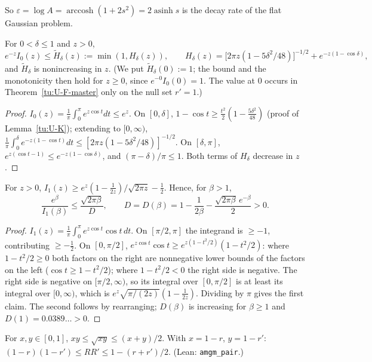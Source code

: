 So $\varepsilon=\log A=\operatorname{arccosh}(1+2s^2)=2\operatorname{asinh}s$ is the decay rate of the flat
Gaussian problem.

\begin{lemma}\label{tu:U-bessel}
For $0<\delta\le1$ and $z>0$,
\[
e^{-z}I_0(z)\le\tilde H_\delta(z):=\min(1,H_\delta(z)),\qquad
H_\delta(z)=\bigl[2\pi z(1-5\delta^2/48)\bigr]^{-1/2}+e^{-z(1-\cos\delta)},
\]
and $\tilde H_\delta$ is nonincreasing in $z$. (We put $\tilde H_\delta(0):=1$; the bound and the monotonicity
then hold for $z\ge0$, since $e^{-0}I_0(0)=1$. The value at $0$ occurs in Theorem~\ref{tu:U-F-master} only
on the null set $r'=1$.)
\end{lemma}

\begin{proof}
$I_0(z)=\frac1\pi\int_0^\pi e^{z\cos t}dt\le e^z$. On $[0,\delta]$, $1-\cos t\ge\frac{t^2}2(1-\frac{5\delta^2}{48})$ (proof of
Lemma~\ref{tu:U-K}); extending to $[0,\infty)$, $\frac1\pi\int_0^\delta e^{-z(1-\cos t)}dt\le[2\pi z(1-5\delta^2/48)]^{-1/2}$. On
$[\delta,\pi]$, $e^{z(\cos t-1)}\le e^{-z(1-\cos\delta)}$, and $(\pi-\delta)/\pi\le1$. Both terms of $H_\delta$ decrease in $z$.
\end{proof}

\begin{lemma}\label{tu:U-I1}
For $z>0$, $I_1(z)\ge e^z(1-\frac1{2z})/\sqrt{2\pi z}-\frac12$. Hence, for $\beta>1$,
\[
\frac{e^\beta}{I_1(\beta)}\le\frac{\sqrt{2\pi\beta}}{D},\qquad D=D(\beta)=1-\frac1{2\beta}-\frac{\sqrt{2\pi\beta}\,e^{-\beta}}2>0 .
\]
\end{lemma}

\begin{proof}
$I_1(z)=\frac1\pi\int_0^\pi e^{z\cos t}\cos t\,dt$. On $[\pi/2,\pi]$ the integrand is $\ge-1$, contributing $\ge-\frac12$. On
$[0,\pi/2]$, $e^{z\cos t}\cos t\ge e^{z(1-t^2/2)}(1-t^2/2)$: where $1-t^2/2\ge0$ both factors on the right are
nonnegative lower bounds of the factors on the left ($\cos t\ge1-t^2/2$); where $1-t^2/2<0$ the right side is
negative. The right side is negative on $[\pi/2,\infty)$, so its integral over $[0,\pi/2]$ is at least its integral
over $[0,\infty)$, which is $e^z\sqrt{\pi/(2z)}(1-\frac1{2z})$. Dividing by $\pi$ gives the first claim. The second follows
by rearranging; $D(\beta)$ is increasing for $\beta\ge1$ and $D(1)=0.0389\ldots>0$.
\end{proof}

\begin{lemma}[AM--GM]\label{tu:U-amgm}
For $x,y\in[0,1]$, $xy\le\sqrt{xy}\le(x+y)/2$. With $x=1-r$, $y=1-r'$:
$(1-r)(1-r')\le RR'\le1-(r+r')/2$. (Lean: \texttt{amgm\_pair}.)
\end{lemma}

